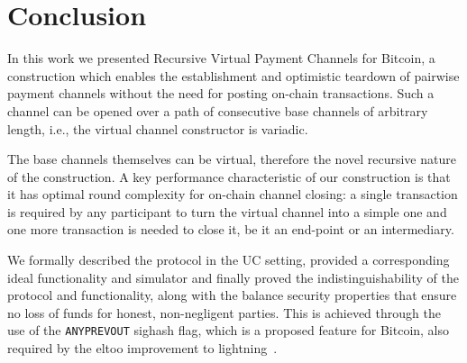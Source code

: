 \section{Conclusion}

  In this work we presented Recursive Virtual Payment Channels for Bitcoin, a
  construction which enables the establishment and optimistic teardown of
  pairwise payment channels without the need for posting on-chain transactions.
  Such a channel can be opened over a path of consecutive base channels of
  arbitrary length, i.e., the virtual channel constructor is variadic.

  The base channels themselves can be virtual, therefore the novel recursive
  nature of the construction. A key performance characteristic of our
  construction is that it has optimal round complexity for on-chain channel
  closing: a single transaction is required by any participant to turn the
  virtual channel into a simple one and one more transaction is needed to close
  it, be it an end-point or an intermediary.

  We formally described the protocol in the UC setting, provided a corresponding
  ideal functionality and simulator and finally proved the indistinguishability
  of the protocol and functionality, along with the balance security properties
  that ensure no loss of funds for honest, non-negligent parties. This is
  achieved through the use of the \texttt{ANYPREVOUT} sighash flag, which is a
  proposed feature for Bitcoin, also required by the eltoo improvement to
  lightning~\cite{eltoo}.

\newpage
